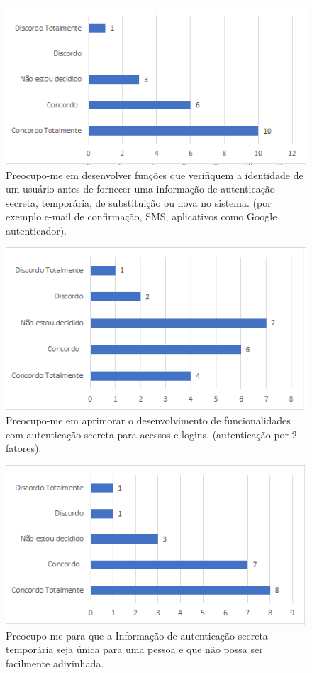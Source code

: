 \begin{figure}[!t]
\centering
\includegraphics[scale=0.7]{figuras das questoes/2.1.png}
\caption{Preocupo-me em desenvolver funções que verifiquem a identidade de um usuário antes de fornecer uma informação de autenticação secreta, temporária, de substituição ou nova no sistema. (por exemplo e-mail de confirmação, SMS, aplicativos como Google autenticador).}
\end{figure}

\begin{figure}[!t]
\centering
\includegraphics[scale=0.7]{figuras das questoes/2.2.png}
\caption{Preocupo-me em aprimorar o desenvolvimento de funcionalidades com autenticação secreta para acessos e logins. (autenticação por 2 fatores).}
\end{figure}

\begin{figure}[!t]
\centering
\includegraphics[scale=0.7]{figuras das questoes/2.3.png}
\caption{Preocupo-me para que a Informação de autenticação secreta temporária seja única para uma pessoa e que não possa ser facilmente adivinhada.}
\end{figure}

